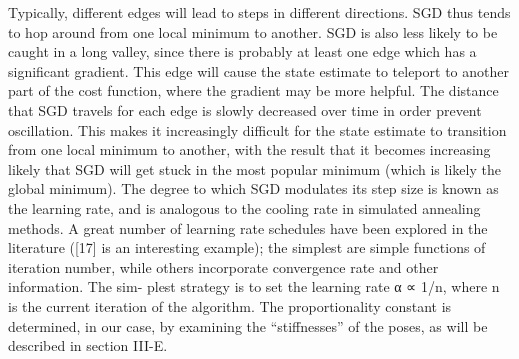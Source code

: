 \documentclass[conference]{IEEEtran}
\begin{document}
Typically, different edges will lead to steps in different directions. SGD thus tends to hop around from one local minimum to another. SGD is also less likely to be caught in a long valley, since there is probably at least one edge which has a significant gradient. This edge will cause the state estimate to teleport to another part of the cost function, where the gradient may be more helpful. The distance that SGD travels for each edge is slowly decreased over time in order prevent oscillation. This makes it increasingly difficult for the state estimate to transition from one local minimum to another, with the result that it becomes increasing likely that SGD will get stuck in the most popular minimum (which is likely the global minimum). The degree to which SGD modulates its step size is known as the learning rate, and is analogous to the cooling rate in simulated annealing methods. A great number of learning rate schedules have been explored in the literature ([17] is an interesting example); the simplest are simple functions of iteration number, while others incorporate convergence rate and other information. The sim- plest strategy is to set the learning rate α ∝ 1/n, where n is the current iteration of the algorithm. The proportionality constant is determined, in our case, by examining the “stiffnesses” of the poses, as will be described in section III-E.
\end{document}
